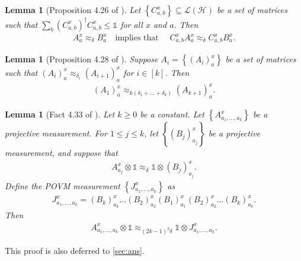\documentclass[10pt,a4paper]{article}
\theoremstyle{plain}
\newtheorem{lemma}[theorem]{Lemma}
\theoremstyle{definition}
\newcommand {\set} [1] {\ensuremath{ \left\lbrace #1 \right\rbrace }}
\newcommand {\id} {\ensuremath{\mathds{1}}}
\newcommand{\x}{\otimes}
\newcommand{\ct}{^{\dagger}}
\newcommand{\calH}{\mathcal{H}}
\newcommand{\calL}{\mathcal{L}}
\newcommand{\appd}[1]{\approx_{#1}}
\newcommand{\1}{\mathbb{1}} %
\begin{document}
\begin{lemma}[Proposition 4.26 of \cite{JNVWYuen'20}]
\label{lm:prod_meas}
Let $\set{ C^x_{a,b} } \subseteq \calL(\calH)$ be a set of matrices such that $\sum_{b} (C^x_{a,b})\ct C^x_{a,b} \leq \id$
for all $x$ and $a$.
Then
\begin{align*}
	A^{x}_a \appd{\delta} B^{x}_a \quad \text{implies that } \quad C^x_{a,b}A^x_a \appd{\delta} C^x_{a,b}B^x_a. 
\end{align*}
\end{lemma}
\begin{lemma}[Proposition 4.28 of \cite{JNVWYuen'20}]
\label{lm:chain_rule}
	Suppose $A_i = \set{ (A_i)^x_a}$ be a set of matrices such that $(A_i)^x_a \appd{\delta_i} (A_{i+1})^x_a$
	for $i \in [k]$. Then 
	\begin{align*}
		(A_1)^x_ a \appd{k(\delta_1 + \ldots + \delta_k)} (A_{k+1})^x_a.
	\end{align*}
\end{lemma}
\begin{lemma}[Fact 4.33 of \cite{neexp}]
	\label{lm:k_prod}
	Let $k \geq 0$ be a constant.
	Let $\set{ A^x_{a_1, \dots, a_k}}$ be a projective measurement.
	For $1 \leq j \leq k$, let $\set{ (B_j)^x_{a_j} }$ be a projective measurement, and suppose that 
	\begin{align*}
		A^x_{a_j} \x \id \appd{\delta} \id \x (B_j)^{x}_{a_j}.
	\end{align*}
	Define the POVM measurement $\set{J^x_{a_1, \dots, a_k}}$ as
	\begin{align*}
		J^x_{a_1, \ldots, a_k} = (B_k)^x_{a_k} \dots (B_2)^{x}_{a_2} (B_1)^x_{a_1} (B_2)^x_{a_2} \dots (B_k)^x_{a_k}.
	\end{align*}
	Then
	\begin{align*}
		A^x_{a_1, \ldots, a_k} \x \id \appd{ (2k-1)^2 \delta }  \id \x J^x_{a_1, \ldots, a_k}.
	\end{align*}
\end{lemma}
This proof is also deferred to \cref{sec:ans}.
\end{document}
